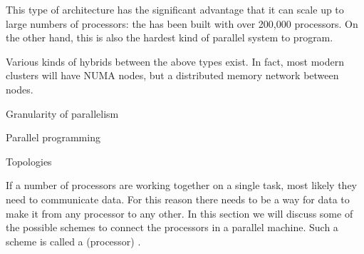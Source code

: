 This type of architecture has the significant advantage that it can
scale up to large numbers of processors: the
 has been built with over 200,000
processors. On the other hand, this is also the hardest kind of
parallel system to program.

Various kinds of hybrids between the above types exist. In fact,
most modern clusters will have \ac{NUMA} nodes, but a distributed
memory network between nodes.

 {Granularity of parallelism}


 {Parallel programming}


 {Topologies}

If a number of processors are working together on a single task, most
likely they need to communicate data. For this reason there needs to
be a way for data to make it from any processor to any other. In this
section we will discuss some of the possible schemes to connect the
processors in a parallel machine. Such a scheme is called a
(processor) .

